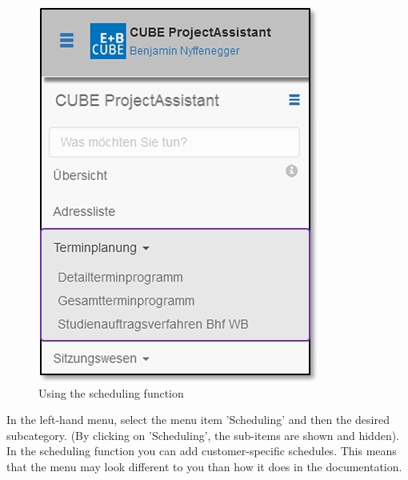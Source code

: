 \begin{figure}   %
  \vspace{-35pt}      %
  \begin{center}
    \includegraphics[width=1\linewidth]{../chapters/04_Terminplanung/pictures/4-1_Menu_Terminplanung.jpg}
  \end{center}
  \vspace{-20pt}
  \caption{Using the scheduling function}
  \vspace{-10pt}
\end{figure}

In the left-hand menu, select the menu item 'Scheduling' and then the desired subcategory. (By clicking on 'Scheduling', the sub-items are shown and hidden). In the scheduling function you can add customer-specific schedules. This means that the menu may look different to you than how it does in the documentation.\\

